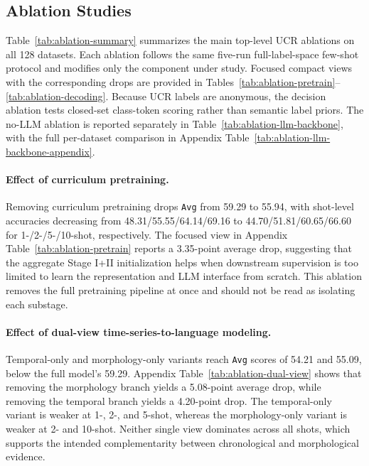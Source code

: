 \documentclass{article}
\begin{document}


\subsection{Ablation Studies}

Table~\ref{tab:ablation-summary} summarizes the main top-level UCR ablations on all 128 datasets. Each ablation follows the same five-run full-label-space few-shot protocol and modifies only the component under study. Focused compact views with the corresponding drops are provided in Tables~\ref{tab:ablation-pretrain}--\ref{tab:ablation-decoding}. Because UCR labels are anonymous, the decision ablation tests closed-set class-token scoring rather than semantic label priors. The no-LLM ablation is reported separately in Table~\ref{tab:ablation-llm-backbone}, with the full per-dataset comparison in Appendix Table~\ref{tab:ablation-llm-backbone-appendix}.



\paragraph{Effect of curriculum pretraining.}
Removing curriculum pretraining drops \texttt{Avg} from 59.29 to 55.94, with shot-level accuracies decreasing from 48.31/55.55/64.14/69.16 to 44.70/51.81/60.65/66.60 for 1-/2-/5-/10-shot, respectively. The focused view in Appendix Table~\ref{tab:ablation-pretrain} reports a 3.35-point average drop, suggesting that the aggregate Stage I+II initialization helps when downstream supervision is too limited to learn the representation and LLM interface from scratch. This ablation removes the full pretraining pipeline at once and should not be read as isolating each substage.

\paragraph{Effect of dual-view time-series-to-language modeling.}
Temporal-only and morphology-only variants reach \texttt{Avg} scores of 54.21 and 55.09, below the full model's 59.29. Appendix Table~\ref{tab:ablation-dual-view} shows that removing the morphology branch yields a 5.08-point average drop, while removing the temporal branch yields a 4.20-point drop. The temporal-only variant is weaker at 1-, 2-, and 5-shot, whereas the morphology-only variant is weaker at 2- and 10-shot. Neither single view dominates across all shots, which supports the intended complementarity between chronological and morphological evidence.
\end{document}
